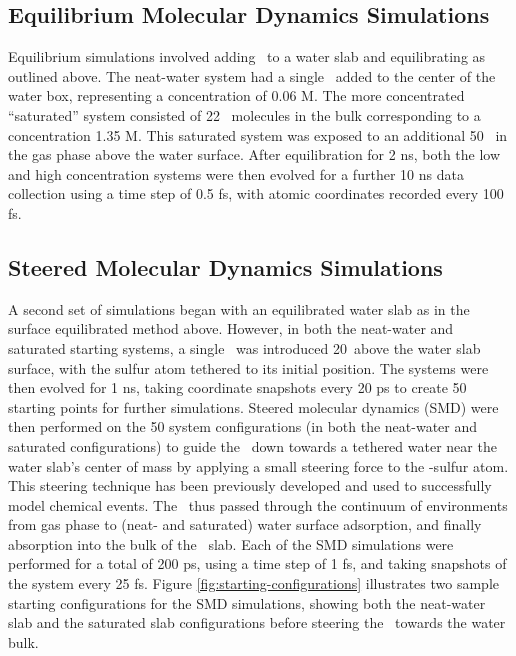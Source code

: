 \documentclass{article}
\begin{document}
\subsection{Equilibrium Molecular Dynamics Simulations}

Equilibrium simulations involved adding \suldiox~to a water slab and equilibrating as outlined above. The neat-water system had a single \suldiox~added to the center of the water box, representing a concentration of 0.06 M. The more concentrated ``saturated'' system consisted of 22 \suldiox~molecules in the bulk corresponding to a concentration 1.35 M. This saturated system was exposed to an additional 50 \suldiox~in the gas phase above the water surface. After equilibration for 2 ns, both the low and high concentration systems were then evolved for a further 10 ns data collection using a time step of 0.5 fs, with atomic coordinates recorded every 100 fs.

\subsection{Steered Molecular Dynamics Simulations}

A second set of simulations began with an equilibrated water slab as in the surface equilibrated method above. However, in both the neat-water and saturated starting systems, a single \suldiox~was introduced 20\angs~above the water slab surface, with the sulfur atom tethered to its initial position. The systems were then evolved for 1 ns, taking coordinate snapshots every 20 ps to create 50 starting points for further simulations. Steered molecular dynamics (SMD) were then performed on the 50 system configurations (in both the neat-water and saturated configurations) to guide the \suldiox~down towards a tethered water near the water slab's center of mass by applying a small steering force to the \suldiox-sulfur atom. This steering technique has been previously developed and used to successfully model chemical events.\cite{Isralewitz2001,Giorgino2011,Bizzarri2011,Strzelecki2009,Patargias2009,Liu2006} The \suldiox~thus passed through the continuum of environments from gas phase to (neat- and saturated) water surface adsorption, and finally absorption into the bulk of the \wat~slab. Each of the SMD simulations were performed for a total of 200 ps, using a time step of 1 fs, and taking snapshots of the system every 25 fs. Figure \ref{fig:starting-configurations} illustrates two sample starting configurations for the SMD simulations, showing both the neat-water slab and the saturated slab configurations before steering the \suldiox~towards the water bulk.
\end{document}

